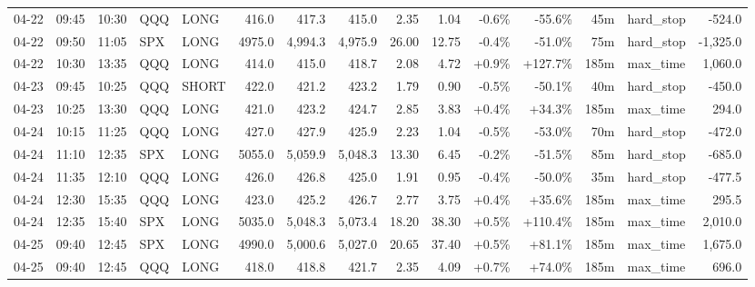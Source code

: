 \documentclass[11pt,a4paper,twoside]{article}
\begin{document}
\begin{landscape}
\begin{center}
\begin{longtable}{>{\color{txtmain}}l l l l l r r r r r r r r >{\color{txtmain}}l r}
04-22 & 09:45 & 10:30 & QQQ & LONG & 416.0 & 417.3 & 415.0 & 2.35 & 1.04 & \textcolor{lossred}{-0.6\%} & \textcolor{lossred}{-55.6\%} & 45m & hard\_stop & \textcolor{lossred}{-524.0} \\
04-22 & 09:50 & 11:05 & SPX & LONG & 4975.0 & 4,994.3 & 4,975.9 & 26.00 & 12.75 & \textcolor{lossred}{-0.4\%} & \textcolor{lossred}{-51.0\%} & 75m & hard\_stop & \textcolor{lossred}{-1,325.0} \\
04-22 & 10:30 & 13:35 & QQQ & LONG & 414.0 & 415.0 & 418.7 & 2.08 & 4.72 & \textcolor{wingreen}{+0.9\%} & \textcolor{wingreen}{+127.7\%} & 185m & max\_time & \textcolor{wingreen}{1,060.0} \\
04-23 & 09:45 & 10:25 & QQQ & SHORT & 422.0 & 421.2 & 423.2 & 1.79 & 0.90 & \textcolor{lossred}{-0.5\%} & \textcolor{lossred}{-50.1\%} & 40m & hard\_stop & \textcolor{lossred}{-450.0} \\
04-23 & 10:25 & 13:30 & QQQ & LONG & 421.0 & 423.2 & 424.7 & 2.85 & 3.83 & \textcolor{wingreen}{+0.4\%} & \textcolor{wingreen}{+34.3\%} & 185m & max\_time & \textcolor{wingreen}{294.0} \\
04-24 & 10:15 & 11:25 & QQQ & LONG & 427.0 & 427.9 & 425.9 & 2.23 & 1.04 & \textcolor{lossred}{-0.5\%} & \textcolor{lossred}{-53.0\%} & 70m & hard\_stop & \textcolor{lossred}{-472.0} \\
04-24 & 11:10 & 12:35 & SPX & LONG & 5055.0 & 5,059.9 & 5,048.3 & 13.30 & 6.45 & \textcolor{lossred}{-0.2\%} & \textcolor{lossred}{-51.5\%} & 85m & hard\_stop & \textcolor{lossred}{-685.0} \\
04-24 & 11:35 & 12:10 & QQQ & LONG & 426.0 & 426.8 & 425.0 & 1.91 & 0.95 & \textcolor{lossred}{-0.4\%} & \textcolor{lossred}{-50.0\%} & 35m & hard\_stop & \textcolor{lossred}{-477.5} \\
04-24 & 12:30 & 15:35 & QQQ & LONG & 423.0 & 425.2 & 426.7 & 2.77 & 3.75 & \textcolor{wingreen}{+0.4\%} & \textcolor{wingreen}{+35.6\%} & 185m & max\_time & \textcolor{wingreen}{295.5} \\
04-24 & 12:35 & 15:40 & SPX & LONG & 5035.0 & 5,048.3 & 5,073.4 & 18.20 & 38.30 & \textcolor{wingreen}{+0.5\%} & \textcolor{wingreen}{+110.4\%} & 185m & max\_time & \textcolor{wingreen}{2,010.0} \\
04-25 & 09:40 & 12:45 & SPX & LONG & 4990.0 & 5,000.6 & 5,027.0 & 20.65 & 37.40 & \textcolor{wingreen}{+0.5\%} & \textcolor{wingreen}{+81.1\%} & 185m & max\_time & \textcolor{wingreen}{1,675.0} \\
04-25 & 09:40 & 12:45 & QQQ & LONG & 418.0 & 418.8 & 421.7 & 2.35 & 4.09 & \textcolor{wingreen}{+0.7\%} & \textcolor{wingreen}{+74.0\%} & 185m & max\_time & \textcolor{wingreen}{696.0} \\

\end{longtable}
\end{center}
\end{landscape}
\end{document}
